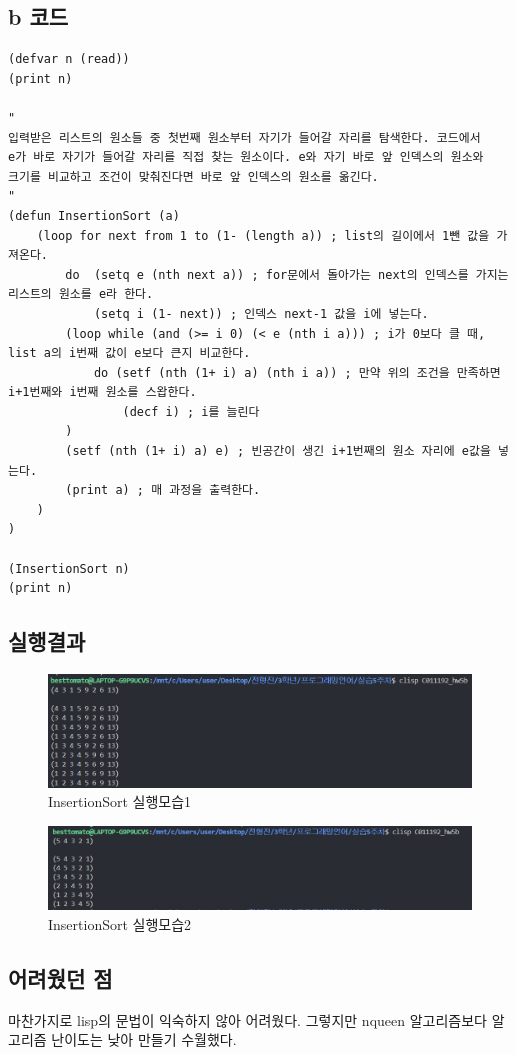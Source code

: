 \documentclass{article}
\begin{document}
\subsection{b 코드}
\begin{verbatim}
(defvar n (read))
(print n)

"
입력받은 리스트의 원소들 중 첫번째 원소부터 자기가 들어갈 자리를 탐색한다. 코드에서
e가 바로 자기가 들어갈 자리를 직접 찾는 원소이다. e와 자기 바로 앞 인덱스의 원소와
크기를 비교하고 조건이 맞춰진다면 바로 앞 인덱스의 원소를 옮긴다.
"
(defun InsertionSort (a)
    (loop for next from 1 to (1- (length a)) ; list의 길이에서 1뺀 값을 가져온다.
        do  (setq e (nth next a)) ; for문에서 돌아가는 next의 인덱스를 가지는 리스트의 원소를 e라 한다.
            (setq i (1- next)) ; 인덱스 next-1 값을 i에 넣는다.                
        (loop while (and (>= i 0) (< e (nth i a))) ; i가 0보다 클 때, list a의 i번째 값이 e보다 큰지 비교한다.
            do (setf (nth (1+ i) a) (nth i a)) ; 만약 위의 조건을 만족하면 i+1번째와 i번째 원소를 스왑한다.
                (decf i) ; i를 늘린다
        )
        (setf (nth (1+ i) a) e) ; 빈공간이 생긴 i+1번째의 원소 자리에 e값을 넣는다.
        (print a) ; 매 과정을 출력한다.
    )
)

(InsertionSort n)
(print n)
\end{verbatim}

\newpage
\subsection{실행결과}

\begin{figure}[h]
    \centering
    \includegraphics[scale = 0.7]{insortpic.png}
    \caption{InsertionSort 실행모습1}
\end{figure}

\begin{figure}[h]
    \centering
    \includegraphics[scale = 0.7]{insortpic2.png}
    \caption{InsertionSort 실행모습2}
\end{figure}

\subsection{어려웠던 점}
마찬가지로 lisp의 문법이 익숙하지 않아 어려웠다. 그렇지만 nqueen 알고리즘보다 알고리즘 난이도는 낮아 만들기 수월했다.
\end{document}
